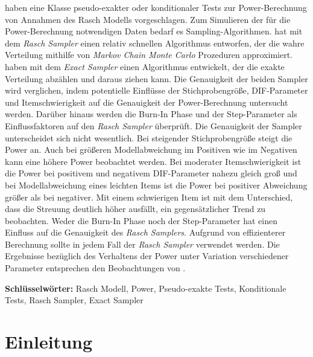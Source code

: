 \documentclass[12pt]{article} %
\begin{document}
	\citet{draxler2015power} haben eine Klasse pseudo-exakter oder konditionaler Tests zur Power-Berechnung von Annahmen des Rasch Modells vorgeschlagen. Zum Simulieren der für die Power-Berechnung notwendigen Daten bedarf es Sampling-Algorithmen. \citet{verhelst2008efficient} hat mit dem \textit{Rasch Sampler} einen relativ schnellen Algorithmus entworfen, der die wahre Verteilung mithilfe von \textit{Markov Chain Monte Carlo} Prozeduren approximiert. \citet{miller2013exact} haben mit dem \textit{Exact Sampler} einen Algorithmus entwickelt, der die exakte Verteilung abzählen und daraus ziehen kann. Die Genauigkeit der beiden Sampler wird verglichen, indem potentielle Einflüsse der Stichprobengröße, DIF-Parameter und Itemschwierigkeit auf die Genauigkeit der Power-Berechnung untersucht werden. Darüber hinaus werden die Burn-In Phase und der Step-Parameter als Einflussfaktoren auf den \textit{Rasch Sampler} überprüft. Die Genauigkeit der Sampler unterscheidet sich nicht wesentlich. Bei steigender Stichprobengröße steigt die Power an. Auch bei größeren Modellabweichung im Positiven wie im Negativen kann eine höhere Power beobachtet werden. Bei moderater Itemschwierigkeit ist die Power bei positivem und negativem DIF-Parameter nahezu gleich groß und bei Modellabweichung eines leichten Items ist die Power bei positiver Abweichung größer als bei negativer. Mit einem schwierigen Item ist mit dem Unterschied, dass die Streuung deutlich höher ausfällt, ein gegensätzlicher Trend zu beobachten. Weder die Burn-In Phase noch der Step-Parameter hat einen Einfluss auf die Genauigkeit des \textit{Rasch Samplers}. Aufgrund von effizienterer Berechnung sollte in jedem Fall der \textit{Rasch Sampler} verwendet werden.	Die Ergebnisse bezüglich des Verhaltens der Power unter Variation verschiedener Parameter entsprechen den Beobachtungen von \citet{draxler2015power}. 	
	\begin{flushleft}
		\textbf{Schlüsselwörter:} Rasch Modell, Power, Pseudo-exakte Tests, Konditionale Tests, Rasch Sampler, Exact Sampler	
	\end{flushleft}
	
	\newpage
	
\section{Einleitung}
	
\end{document}
